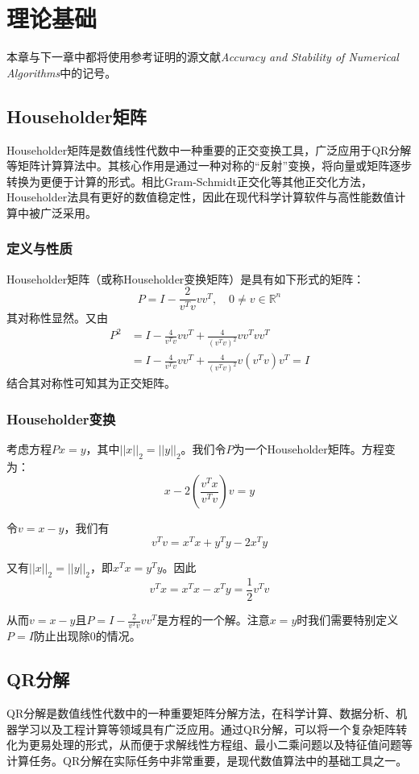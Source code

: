 \documentclass[UTF8,a4paper,openany]{ctexbook}
\begin{document}
\chapter{理论基础}

本章与下一章中都将使用参考证明的源文献\textit{Accuracy and Stability of Numerical Algorithms}中的记号。

\section{Householder矩阵}

Householder矩阵是数值线性代数中一种重要的正交变换工具，广泛应用于QR分解等矩阵计算算法中。其核心作用是通过一种对称的“反射”变换，将向量或矩阵逐步转换为更便于计算的形式。相比Gram-Schmidt正交化等其他正交化方法，Householder法具有更好的数值稳定性，因此在现代科学计算软件与高性能数值计算中被广泛采用。

\subsection{定义与性质}

Householder矩阵（或称Householder变换矩阵）是具有如下形式的矩阵：
$$P=I-\frac{2}{v^Tv}vv^T,\quad 0\neq v \in \mathbb{R}^n$$
其对称性显然。又由
\begin{align*}
P^2&=I-\frac{4}{v^Tv}vv^T+\frac{4}{(v^Tv)^2}vv^Tvv^T\\&=I-\frac{4}{v^Tv}vv^T+\frac{4}{(v^Tv)^2}v(v^Tv)v^T=I
\end{align*}
结合其对称性可知其为正交矩阵。

\subsection{Householder变换}

考虑方程$Px=y$，其中$||x||_2=||y||_2$。我们令$P$为一个Householder矩阵。方程变为：$$x-2(\frac{v^Tx}{v^Tv})v=y$$

令$v=x-y$，我们有$$v^Tv=x^Tx+y^Ty-2x^Ty$$

又有$||x||_2=||y||_2$，即$x^Tx=y^Ty$。因此$$v^Tx=x^Tx-x^Ty=\frac{1}{2}v^Tv$$

从而$v=x-y$且$P=I-\frac{2}{v^Tv}vv^T$是方程的一个解。注意$x=y$时我们需要特别定义$P=I$防止出现除$0$的情况。

\section{QR分解}

QR分解是数值线性代数中的一种重要矩阵分解方法，在科学计算、数据分析、机器学习以及工程计算等领域具有广泛应用。通过QR分解，可以将一个复杂矩阵转化为更易处理的形式，从而便于求解线性方程组、最小二乘问题以及特征值问题等计算任务。QR分解在实际任务中非常重要，是现代数值算法中的基础工具之一。
\end{document}
